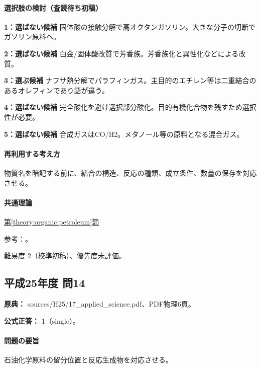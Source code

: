 \paragraph{選択肢の検討（査読待ち初稿）}\mbox{}\par

\noindent\textbf{1：選ばない候補} 固体酸の接触分解で高オクタンガソリン。大きな分子の切断でガソリン原料へ。\par

\noindent\textbf{2：選ばない候補} 白金/固体酸改質で芳香族。芳香族化と異性化などによる改質。\par

\noindent\textbf{3：選ぶ候補} ナフサ熱分解でパラフィンガス。主目的のエチレン等は二重結合のあるオレフィンであり語が違う。\par

\noindent\textbf{4：選ばない候補} 完全酸化を避け選択部分酸化。目的有機化合物を残すため選択性が必要。\par

\noindent\textbf{5：選ばない候補} 合成ガスはCO/H2。メタノール等の原料となる混合ガス。\par

\paragraph{再利用する考え方} 物質名を暗記する前に、結合の構造、反応の種類、成立条件、数量の保存を対応させる。

\paragraph{共通理論} \hyperref[theory:organic:petroleum]{第\ref*{theory:organic:petroleum}節}

\par 参考：\cite{organic_jpca,organic_gasoline}。

\par 難易度 2（校準初稿）、優先度未評価。

\subsection{平成25年度 問14}
\label{q:h25-reg-applied-14}

\noindent\textbf{原典：} sources/H25/17\_applied\_science.pdf、PDF物理6頁。

\textbf{公式正答：} 1（single）。

\paragraph{問題の要旨} 石油化学原料の留分位置と反応生成物を対応させる。

